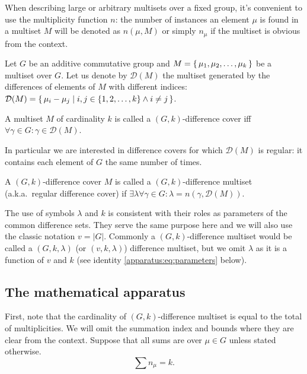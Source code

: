 When describing large or arbitrary multisets over a fixed group, it's convenient to use the multiplicity function $n$: the number of instances an element $\mu$ is found in a multiset $M$ will be denoted as $n(\mu,M)$ or simply $n_\mu$ if the multiset is obvious from the context.

Let $G$ be an additive commutative group and $M=\set{\mu_1, \mu_2, \ldots, \mu_k}$ be a multiset over $G$. Let us denote by $\mathcal D(M)$ the multiset generated by the differences of elements of $M$ with different indices: 
$\mathcal D (M) = \set{\mu_i-\mu_j \mid i, j \in \{1,2,\ldots,k\} \land i \neq j}$.

\begin{definition}
    \label{dms:def:dc}
    A multiset $M$ of cardinality $k$ is called a $(G,k)$-difference cover iff $\forall \gamma \in G \colon \gamma \in \mathcal D(M)$.
\end{definition}

In particular we are interested in difference covers 
for which $\mathcal D(M)$ is regular: it contains each element of $G$ the same number of times.

\begin{definition}
    \label{dms:def:dms}
    A $(G,k)$-difference cover $M$ is called a $(G,k)$-difference multiset (a.k.a.\ regular difference cover) if $\exists \lambda  \forall \gamma \in G \colon \lambda = n(\gamma, \mathcal D(M))$.
\end{definition}

The use of symbols $\lambda$ and $k$ is consistent with their roles as parameters of the common difference sets. They serve the same purpose here and we will also use the classic notation $v = |G|$. Commonly a $(G,k)$-difference multiset would be called a $(G,k,\lambda)$ (or $(v,k,\lambda)$) difference multiset, but we omit $\lambda$ as it is a function of $v$ and $k$ 
(see identity \eqref{apparatus:eq:parameters} below).


\subsection{The mathematical apparatus}
    \label{sec:apparatus}
    First, note that the cardinality of $(G,k)$-difference multiset is equal to the total of multiplicities. We will omit the summation index and bounds where they are clear from the context. Suppose that all sums are over $\mu \in G$ unless stated otherwise.
    \begin{equation}
        \label{apparatus:eq:ni}
        \sum {n_\mu} = k.
    \end{equation}
    
